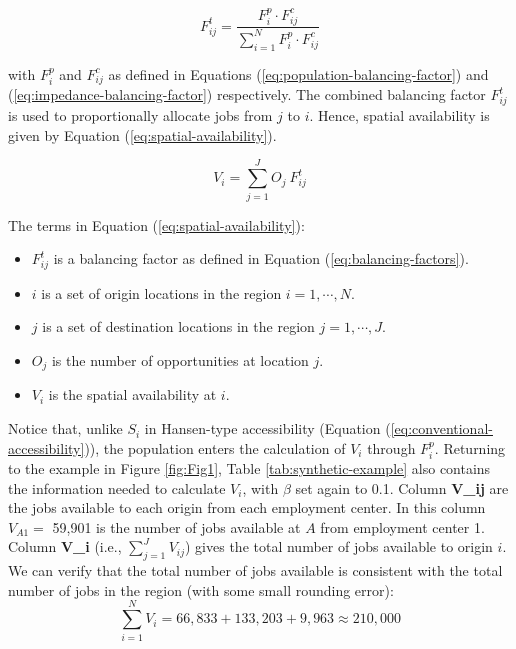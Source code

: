 \documentclass[10pt,letterpaper]{article}
\providecommand{\tightlist}{%
  \setlength{\itemsep}{0pt}\setlength{\parskip}{0pt}}
\begin{document}
\begin{equation}
\label{eq:balancing-factors}
F^t_{ij} = \frac{F^p_{i} \cdot F^c_{ij}}{\sum_{i=1}^N F^p_{i} \cdot F^c_{ij}}
\end{equation}

\noindent with \(F^p_{i}\) and \(F^c_{ij}\) as defined in Equations
(\ref{eq:population-balancing-factor}) and
(\ref{eq:impedance-balancing-factor}) respectively. The combined
balancing factor \(F^t_{ij}\) is used to proportionally allocate jobs
from \(j\) to \(i\). Hence, spatial availability is given by Equation
(\ref{eq:spatial-availability}).

\begin{equation}
\label{eq:spatial-availability}
V_{i} = \sum_{j=1}^J O_j\ F^t_{ij}
\end{equation}

The terms in Equation (\ref{eq:spatial-availability}):

\begin{itemize}
\tightlist
\item
  \(F^t_{ij}\) is a balancing factor as defined in Equation
  (\ref{eq:balancing-factors}).
\item
  \(i\) is a set of origin locations in the region \(i = 1,\cdots, N\).
\item
  \(j\) is a set of destination locations in the region
  \(j = 1,\cdots,J\).
\item
  \(O_j\) is the number of opportunities at location \(j\).
\item
  \(V_{i}\) is the spatial availability at \(i\).
\end{itemize}

Notice that, unlike \(S_i\) in Hansen-type accessibility (Equation
(\ref{eq:conventional-accessibility})), the population enters the
calculation of \(V_{i}\) through \(F^p_i\). Returning to the example in
Figure \ref{fig:Fig1}, Table \ref{tab:synthetic-example} also contains
the information needed to calculate \(V_i\), with \(\beta\) set again to
0.1. Column \textbf{V\_ij} are the jobs available to each origin from
each employment center. In this column \(V_{A1}=\) 59,901 is the number
of jobs available at \(A\) from employment center 1. Column
\textbf{V\_i} (i.e., \(\sum_{j=1}^JV_{ij}\)) gives the total number of
jobs available to origin \(i\). We can verify that the total number of
jobs available is consistent with the total number of jobs in the region
(with some small rounding error): \[
\sum_{i=1}^N V_i = 66,833 + 133,203 + 9,963 \approx 210,000 
\]
\end{document}
